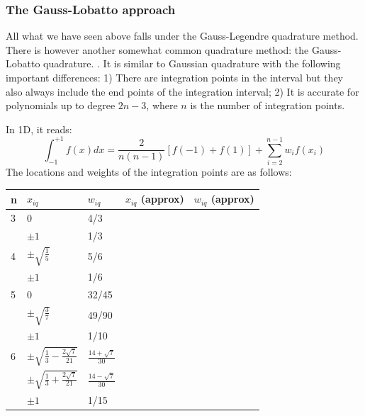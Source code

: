 \subsubsection{The Gauss-Lobatto approach \label{sec:loba}}

All what we have seen above falls under the Gauss-Legendre quadrature method. There is however another 
somewhat common quadrature method: the Gauss-Lobatto  quadrature. .
It is similar to Gaussian quadrature with the following  important differences:
1) There are integration points in the interval but they also always include the end points of the integration interval;
2) It is accurate for polynomials up to degree $2n-3$, where $n$ is the number of integration points.

In 1D, it reads:
\[
\int_{-1}^{+1} f(x) dx = \frac{2}{n(n-1)} [f(-1)+f(1)] + \sum_{i=2}^{n-1} w_i f(x_i) 
\]
The locations and weights of the integration points are as follows:

\begin{center}
\begin{tabular}{lllll}
\hline
n & $x_{iq}$ & $w_{iq}$ & $x_{iq}$ (approx) & $w_{iq}$ (approx) \\
\hline\hline
3 & 0 & 4/3 & & \\
  & $\pm 1$ & 1/3 & &  \\
\hline
4 & $\pm\sqrt{\frac{1}{5}}$ & 5/6 & & \\
  & $\pm 1$ & 1/6 & & \\
\hline
5 & 0 & 32/45 & & \\
  & $\pm\sqrt{\frac{3}{7}}$ & 49/90 & & \\
  & $\pm 1$ & 1/10 & & \\
\hline
6 & $\pm\sqrt{\frac{1}{3} -\frac{2\sqrt{7}}{21}}$ & $\frac{14+\sqrt{7}}{30}$ & & \\
  & $\pm\sqrt{\frac{1}{3} +\frac{2\sqrt{7}}{21}}$ & $\frac{14-\sqrt{7}}{30}$ & & \\
  & $\pm 1$ & 1/15 \\
\hline
\end{tabular}
\end{center}

 






